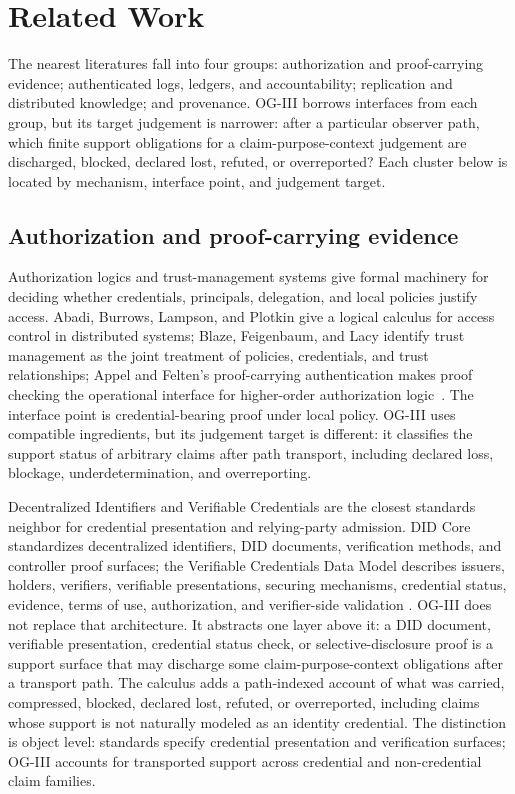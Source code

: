 \documentclass[11pt,twoside]{article}
\theoremstyle{definition}
\begin{document}
\section{Related Work}
\label{sec:related-work}

The nearest literatures fall into four groups: authorization and
proof-carrying evidence; authenticated logs, ledgers, and accountability;
replication and distributed knowledge; and provenance. OG-III borrows
interfaces from each group, but its target judgement is narrower: after a
particular observer path, which finite support obligations for a
claim-purpose-context judgement are discharged, blocked, declared lost,
refuted, or overreported? Each cluster below is located by mechanism,
interface point, and judgement target.

\subsection{Authorization and proof-carrying evidence}

Authorization logics and trust-management systems give formal machinery for
deciding whether credentials, principals, delegation, and local policies justify
access. Abadi, Burrows, Lampson, and Plotkin give a logical calculus for access
control in distributed systems; Blaze, Feigenbaum, and Lacy identify trust
management as the joint treatment of policies, credentials, and trust
relationships; Appel and Felten's proof-carrying authentication makes proof
checking the operational interface for higher-order authorization
logic~\cite{abadi_access_control_1993,blaze_trust_management_1996,appel_pca_1999}.
The interface point is credential-bearing proof under local policy. OG-III
uses compatible ingredients, but its judgement target is different: it
classifies the support status of arbitrary claims after path transport,
including declared loss, blockage, underdetermination, and overreporting.

Decentralized Identifiers and Verifiable Credentials are the closest standards
neighbor for credential presentation and relying-party admission. DID Core
standardizes decentralized identifiers, DID documents, verification methods,
and controller proof surfaces; the Verifiable Credentials Data Model describes
issuers, holders, verifiers, verifiable presentations, securing mechanisms,
credential status, evidence, terms of use, authorization, and verifier-side
validation \cite{w3c_did_core_2022,w3c_vc_data_model_2025}. OG-III does not
replace that architecture. It abstracts one layer above it: a DID document,
verifiable presentation, credential status check, or selective-disclosure proof
is a support surface that may discharge some claim-purpose-context obligations
after a transport path. The calculus adds a path-indexed account of what was
carried, compressed, blocked, declared lost, refuted, or overreported, including
claims whose support is not naturally modeled as an identity credential. The
distinction is object level: standards specify credential presentation and
verification surfaces; OG-III accounts for transported support across credential
and non-credential claim families.
\end{document}
